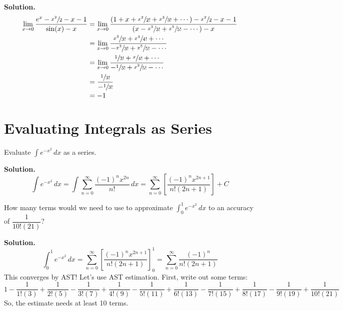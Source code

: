 \begin{Example}{}{}
\begin{enumerate}
              \textbf{Solution.}
              \begin{align*}
                  \lim\limits_{{x} \to {0}} \frac{e^x-\sfrac{x^2}{2} -x-1}{\sin(x)-x}
                   & =\lim\limits_{{x} \to {0}}
                  \frac{\left( 1+x+\sfrac{x^2}{2!}+\sfrac{x^3}{3!}+\cdots \right)-
                  \sfrac{x^2}{2} -x-1}{\left( x-\sfrac{x^3}{3!} +\sfrac{x^5}{5!} -\cdots \right)-x}       \\
                   & =\lim\limits_{{x} \to {0}}
                  \frac{\sfrac{x^3}{3!} +\sfrac{x^4}{4!}+\cdots}{-\sfrac{x^3}{3!}+\sfrac{x^5}{5!}-\cdots} \\
                   & =\lim\limits_{{x} \to {0}}
                  \frac{\sfrac{1}{3!}+\sfrac{x}{4!}+\cdots}{-\sfrac{1}{3!}+\sfrac{x^2}{5!} -\cdots}       \\
                   & =\frac{\sfrac{1}{3!}  }{-\sfrac{1}{3!}  }                                            \\
                   & =-1
              \end{align*}
    \end{enumerate}
\end{Example}

\section*{Evaluating Integrals as Series}

\begin{Example}{}{}
    Evaluate $ \displaystyle \int e^{-x^2}\, d{x} $ as a series.

    \textbf{Solution.}
    \[ \int e^{-x^2}\, d{x}
        =\int \sum\limits_{n=0}^{\infty} \frac{(-1)^n x^{2n}}{n!} \, d{x}
        =\sum\limits_{n=0}^{\infty} \left[ \frac{(-1)^n x^{2n+1}}{n!(2n+1)} \right]+C \]
\end{Example}

\begin{Example}{}{}
    How many terms would we need to use to approximate
    $ \displaystyle \int_{0}^{1} e^{-x^2}\, d{x} $
    to an accuracy of $ \dfrac{1}{10!(21)} $?

    \textbf{Solution.}
    \[ \int_{0}^{1} e^{-x^2}\, d{x}
        = \sum\limits_{n=0}^{\infty}\left[ \frac{(-1)^n x^{2n+1}}{n!(2n+1)} \right]_0^1
        =\sum\limits_{n=0}^{\infty} \frac{(-1)^n}{n!(2n+1)}   \]
    This converges by AST\@! Let's use AST estimation. First, write out some terms:
    \[ 1-\frac{1}{1!(3)} +\frac{1}{2!(5)} -\frac{1}{3!(7)} +\frac{1}{4!(9)}-
        \frac{1}{5!(11)}+\frac{1}{6!(13)} -\frac{1}{7!(15)} +\frac{1}{8!(17)} -\frac{1}{9!(19)} +\frac{1}{10!(21)} \]
    So, the estimate needs at least 10 terms.
\end{Example}

